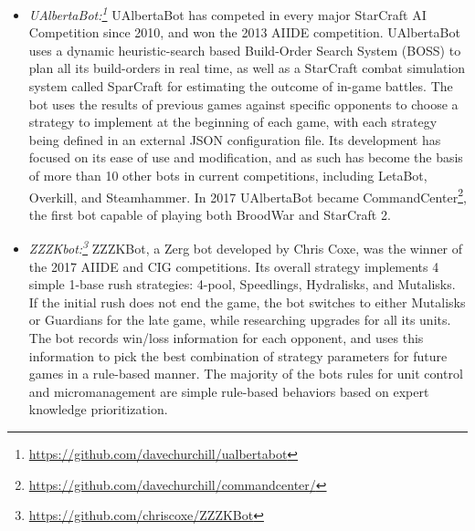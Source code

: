 \begin{itemize}
  \item {\em UAlbertaBot:\footnote{\url{https://github.com/davechurchill/ualbertabot}}} UAlbertaBot has competed in every major StarCraft AI Competition since 2010, and won the 2013 AIIDE competition. UAlbertaBot uses a dynamic heuristic-search based Build-Order Search System (BOSS) to plan all its build-orders in real time, as well as a StarCraft combat simulation system called SparCraft for estimating the outcome of in-game battles. The bot uses the results of previous games against specific opponents to choose a strategy to implement at the beginning of each game, with each strategy being defined in an external JSON configuration file. Its development has focused on its ease of use and modification, and as such has become the basis of more than 10 other bots in current competitions, including LetaBot, Overkill, and Steamhammer. In 2017 UAlbertaBot became CommandCenter\footnote{\url{https://github.com/davechurchill/commandcenter/}}, the first bot capable of playing both BroodWar and StarCraft 2.
  
  
  \item {\em ZZZKbot:\footnote{\url{https://github.com/chriscoxe/ZZZKBot}}} ZZZKBot, a Zerg bot developed by Chris Coxe, was the winner of the 2017 AIIDE and CIG competitions. Its overall strategy implements 4 simple 1-base rush strategies: 4-pool, Speedlings, Hydralisks, and Mutalisks. If the initial rush does not end the game, the bot switches to either Mutalisks or Guardians for the late game, while researching upgrades for all its units. The bot records win/loss information for each opponent, and uses this information to pick the best combination of strategy parameters for future games in a rule-based manner. The majority of the bots rules for unit control and micromanagement are simple rule-based behaviors based on expert knowledge prioritization.

\end{itemize}



